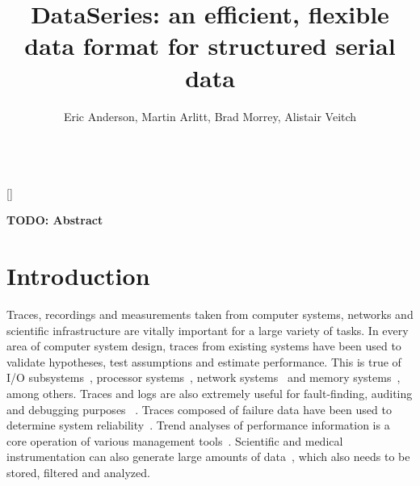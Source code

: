 \documentclass{acm_proc_article-sp}
\begin{document}
\newcommand{\DataSeries}{DataSeries}
\newcommand{\DS}{DS}

\title{DataSeries: an efficient, flexible data format for structured serial data}
\author{
\alignauthor
Eric Anderson, Martin Arlitt, Brad Morrey, Alistair Veitch  \\
  \\
}

\maketitle
[]
 


{\bf TODO: Abstract}

\section{Introduction}\label{sec:intro}

Traces, recordings and measurements taken from computer systems,
networks and scientific infrastructure are vitally important for a
large variety of tasks. In every area of computer system design,
traces from existing systems have been used to validate hypotheses,
test assumptions and estimate performance. This is true of I/O
subsystems~\cite{IORef,Ji03,Uysal03}, processor
systems~\cite{ProcRef}, network systems~\cite{NetRef} and memory
systems~\cite{MemRef}, among others. Traces and logs are also
extremely useful for fault-finding, auditing and debugging purposes
~\cite{DebugRef}. Traces composed of failure data have been used to
determine system reliability~\cite{ReliabilityRef, Schroeder07,
Pinheiro07}. Trend analyses of performance information is a core
operation of various management tools~\cite{MgmtRef}. Scientific and
medical instrumentation can also generate large amounts of
data~\cite{SciRef}, which also needs to be stored, filtered and
analyzed.
\end{document}

